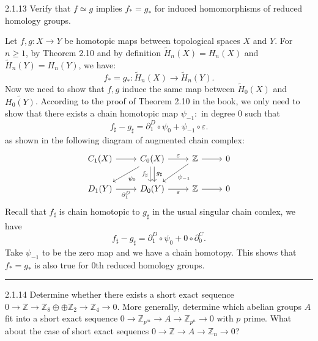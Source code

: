 \documentclass[a4paper, 11pt]{article}
\begin{document}
\begin{problem}{2.1.13}
Verify that \(f\simeq g\) implies \(f_*=g_*\) for induced homomorphisms of reduced homology groups.
\end{problem}
\begin{solution}
Let \(f,g:X\rightarrow Y\) be homotopic maps between topological spaces \(X\) and \(Y\). For \(n\geq 1\), by Theorem 2.10 and by definition \(\tilde{H}_n(X)=H_n(X)\) and 
\(\tilde{H}_n(Y)=H_n(Y)\), we have:
$$f_*=g_*:\tilde{H}_n(X)\rightarrow \tilde{H}_n(Y).$$
Now we need to show that \(f,g\) induce the same map between \(\tilde{H}_0(X)\) and \(\tilde{H_0(Y)}\). According to the proof of Theorem 2.10 in the book, we only need to show that 
there exists a chain homotopic map \(\psi_{-1}:\) in degree 0 such that 
$$f_\sharp-g_\sharp=\partial_1^D\circ \psi_0+\psi_{-1}\circ \varepsilon.$$
as shown in the following diagram of augmented chain complex:
$$\begin{tikzcd}
	{C_1(X)} & {C_0(X)} & {\mathbb{Z}} & 0 \\
	{D_1(Y)} & {D_0(Y)} & {\mathbb{Z}} & 0
	\arrow[from=1-1, to=1-2]
	\arrow["\varepsilon", from=1-2, to=1-3]
	\arrow["{\psi_0}", from=1-2, to=2-1]
	\arrow["{f_\sharp}"', shift right, from=1-2, to=2-2]
	\arrow["{g_\sharp}", shift left, from=1-2, to=2-2]
	\arrow[from=1-3, to=1-4]
	\arrow["{\psi_{-1}}", from=1-3, to=2-2]
	\arrow["{\partial_1^D}"', from=2-1, to=2-2]
	\arrow["\varepsilon"', from=2-2, to=2-3]
	\arrow[from=2-3, to=2-4]
\end{tikzcd}$$
Recall that \(f_\sharp\) is chain homotopic to \(g_\sharp\) in the usual singular chain comlex, we have 
$$f_\sharp-g_\sharp=\partial_1^D\circ \psi_0+0\circ \partial_0^C.$$
Take \(\psi_{-1}\) to be the zero map and we have a chain homotopy. This shows that \(f_*=g_*\) is also true for \(0\)th reduced homology groups.

\end{solution}
\noindent\rule{7in}{2.8pt}
\begin{problem}{2.1.14}
Determine whether there exists a short exact sequence \(0\rightarrow \mathbb{Z}\rightarrow \mathbb{Z}_8\oplus \oplus \mathbb{Z}_2\rightarrow \mathbb{Z}_4\rightarrow 0\). 
More generally, determine which abelian groups \(A\) fit into a short exact sequence \(0\rightarrow \mathbb{Z}_{p^m}\rightarrow A\rightarrow \mathbb{Z}_{p^n}\rightarrow 0\) with 
\(p\) prime. What about the case of short exact sequencs \(0\rightarrow \mathbb{Z}\rightarrow A\rightarrow \mathbb{Z}_n\rightarrow 0\)?
\end{problem}
\end{document}
